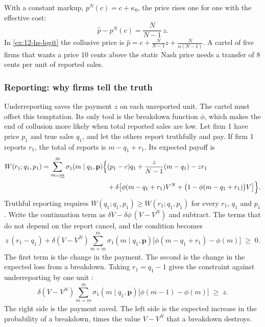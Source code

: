 With a constant markup, $p^N(c) = c + \kappa_0$, the price rises one for one with the effective cost:
\begin{equation}\label{eq:12-hs-markup}
  \hat p - p^N(c) = \frac{N}{N-1}\,z .
\end{equation}
In \cref{ex:12-hs-logit} the collusive price is $\hat p = c + \frac{N}{N-1}z + \frac{N}{\alpha(N-1)}$. A cartel of
five firms that wants a price 10 cents above the static Nash price needs a transfer of 8 cents per unit of reported
sales.

\subsubsection{Reporting: why firms tell the truth}

Underreporting saves the payment $z$ on each unreported unit. The cartel must offset this temptation. Its only tool
is the breakdown function $\phi$, which makes the end of collusion more likely when total reported sales are low.
Let firm 1 have price $p_1$ and true sales $q_1$, and let the others report truthfully and pay. If firm 1 reports
$r_1$, the total of reports is $m - q_1 + r_1$. Its expected payoff is
\begin{equation}\label{eq:12-hs-W}
\begin{split}
  W(r_1; q_1, p_1) = \sum_{m=\underline m}^{\bar m}\sigma_1(m \mid q_1, \mathbf{p})\Bigl\{
  &(p_1 - c)q_1 + \frac{z}{N-1}(m - q_1) - z r_1 \\
  &+ \delta\bigl[\phi(m - q_1 + r_1)V^N + \bigl(1 - \phi(m - q_1 + r_1)\bigr)V\bigr]\Bigr\} .
\end{split}
\end{equation}
Truthful reporting requires $W(q_1; q_1, p_1) \ge W(r_1; q_1, p_1)$ for every $r_1$, $q_1$ and $p_1$. Write the
continuation term as $\delta V - \delta\phi\,(V - V^N)$ and subtract. The terms that do not depend on the report
cancel, and the condition becomes
\begin{equation}\label{eq:12-hs-truth}
  z\,(r_1 - q_1) + \delta(V - V^N)\sum_{m=\underline m}^{\bar m}\sigma_1(m \mid q_1, \mathbf{p})
  \bigl[\phi(m - q_1 + r_1) - \phi(m)\bigr] \;\ge\; 0 .
\end{equation}
The first term is the change in the payment. The second is the change in the expected loss from a breakdown. Taking
$r_1 = q_1 - 1$ gives the constraint against underreporting by one unit \citep[equation
(5)]{HarringtonSkrzypacz2011}:
\begin{equation}\label{eq:12-hs-icc}
  \delta(V - V^N)\sum_{m=\underline m}^{\bar m}\sigma_1(m \mid q_1, \mathbf{p})\bigl[\phi(m-1) - \phi(m)\bigr]
  \;\ge\; z .
\end{equation}
The right side is the payment saved. The left side is the expected increase in the probability of a breakdown,
times the value $V - V^N$ that a breakdown destroys.

